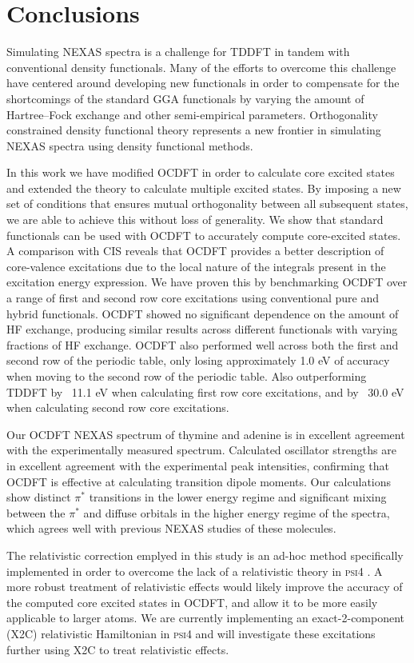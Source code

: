 \documentclass[8.5pt,twoside,twocolumn]{article}
\begin{document}
\section{Conclusions}
Simulating NEXAS spectra is a challenge for TDDFT in tandem with conventional density functionals. Many of the efforts to overcome this challenge have centered around developing new functionals in order to compensate for the shortcomings of the standard GGA functionals by varying the amount of Hartree--Fock exchange and other semi-empirical parameters.
Orthogonality constrained density functional theory represents a new frontier in simulating NEXAS spectra using density functional methods.

In this work we have modified OCDFT in order to calculate core excited states and extended the theory to calculate multiple excited states. By imposing a new set of conditions that ensures mutual orthogonality between all subsequent states, we are able to achieve this without loss of generality. We show that standard functionals can be used with OCDFT to accurately compute core-excited states. A comparison with CIS reveals  that OCDFT provides a better description of core-valence excitations due to the local nature of the integrals present in the excitation energy expression. We have proven this by benchmarking OCDFT over a range of first and second row core excitations using conventional pure and hybrid functionals. OCDFT showed no significant dependence on the amount of HF exchange, producing similar results across different functionals with varying fractions of HF exchange. OCDFT also performed well across both the first and second row of the periodic table, only losing approximately 1.0 eV of accuracy when moving to the second row of the periodic table. Also outperforming TDDFT by ~11.1 eV when calculating first row core excitations, and by ~30.0 eV when calculating second row core excitations.

Our OCDFT NEXAS spectrum of thymine and adenine is in excellent agreement with the experimentally measured spectrum. Calculated oscillator strengths are in excellent agreement with the experimental peak intensities, confirming that OCDFT is effective at calculating transition dipole moments. Our calculations show distinct $\pi^*$ transitions in the lower energy regime and significant mixing between the $\pi^*$ and diffuse orbitals in the higher energy regime of the spectra, which agrees well with previous NEXAS studies of these molecules.

The relativistic correction emplyed in this study is an ad-hoc method specifically implemented in order to overcome the lack of a relativistic theory in \textsc{psi4} . A more robust treatment of relativistic effects would likely improve the accuracy of the computed core excited states in OCDFT, and allow it to be more easily applicable to larger atoms. We are currently implementing an exact-2-component (X2C) relativistic Hamiltonian in \textsc{psi4}  and will investigate these excitations further using X2C to treat relativistic effects. 
\end{document}
